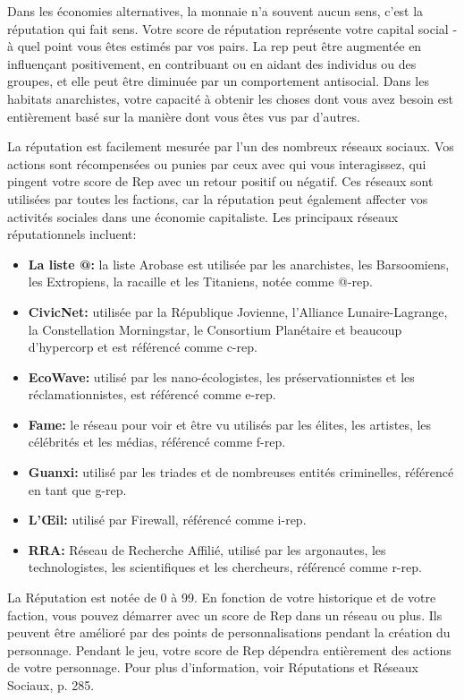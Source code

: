 Dans les économies alternatives, la monnaie n'a souvent aucun sens, c'est la réputation qui fait sens. Votre score de réputation représente votre capital social - à quel point vous êtes estimés par vos pairs. La rep peut être augmentée en influençant positivement, en contribuant ou en aidant des individus ou des groupes, et elle peut être diminuée par un comportement antisocial.  Dans les habitats anarchistes, votre capacité à obtenir les choses dont vous avez besoin est entièrement basé sur la manière dont vous êtes vus par d'autres. 

La réputation est facilement mesurée par l'un des nombreux réseaux sociaux. Vos actions sont récompensées ou punies par ceux avec qui vous interagissez, qui pingent votre score de Rep avec un retour positif ou négatif. Ces réseaux sont utilisées par toutes les factions, car la réputation peut également affecter vos activités sociales dans une économie capitaliste. Les principaux réseaux réputationnels incluent: 

\begin{itemize} \item \textbf{La liste @:} la liste Arobase est utilisée par les anarchistes, les Barsoomiens, les Extropiens, la racaille et les Titaniens, notée comme @-rep. \item \textbf{CivicNet:} utilisée par la République Jovienne, l'Alliance Lunaire-Lagrange, la Constellation Morningstar, le Consortium Planétaire et beaucoup d'hypercorp et est référencé comme c-rep. \item \textbf{EcoWave:} utilisé par les nano-écologistes, les préservationnistes et les réclamationnistes, est référencé comme e-rep. \item \textbf{Fame:} le réseau pour voir et être vu utilisés par les élites, les artistes, les célébrités et les médias, référencé comme f-rep. \item \textbf{Guanxi:} utilisé par les triades et de nombreuses entités criminelles, référencé en tant que g-rep. \item \textbf{L'Œil:} utilisé par Firewall, référencé comme i-rep. \item \textbf{RRA:} Réseau de Recherche Affilié, utilisé par les argonautes, les technologistes, les scientifiques et les chercheurs, référencé comme r-rep. \end{itemize} 

La Réputation est notée de 0 à 99. En fonction de votre historique et de votre faction, vous pouvez démarrer avec un score de Rep dans un réseau ou plus. Ils peuvent être amélioré par des points de personnalisations pendant la création du personnage. Pendant le jeu, votre score de Rep dépendra entièrement des actions de votre personnage. Pour plus d'information, voir Réputations et Réseaux Sociaux, p. 285. 

